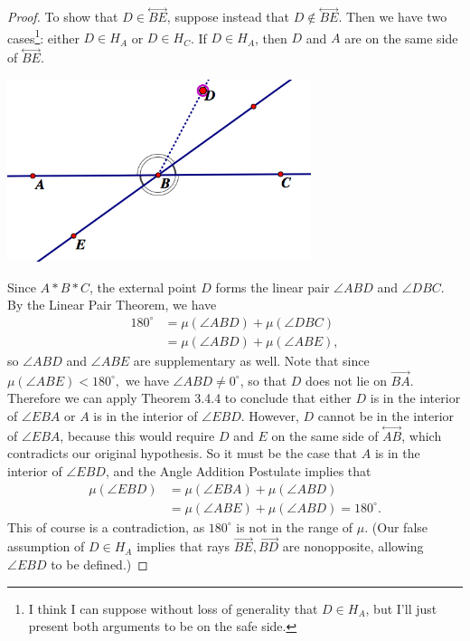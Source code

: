 \documentclass{article}
\newcommand{\ray}[1]{\overrightarrow{#1}}
\renewcommand{\line}[1]{\stackrel{\longleftrightarrow}{#1}}
\renewcommand{\deg}{^{\circ}}
\begin{document}
\begin{proof}
To show that $D\in\line{BE}$, suppose instead that $D\notin\line{BE}$. Then we have two cases\footnote{I think I can suppose without loss of generality that $D\in H_A$, but I'll just present both arguments to be on the safe side.}: either $D\in H_A$ or $D\in H_C$. If $D\in H_A$, then $D$ and $A$ are on the same side of $\line{BE}$. 
\begin{center}
\includegraphics[width=3.5in]{S3_5_6b.png}
\end{center}
Since $A*B*C$, the external point $D$ forms the linear pair $\angle{ABD}$ and $\angle{DBC}$. By the Linear Pair Theorem, we have
\begin{align*}
180\deg&=\mu(\angle{ABD} )+\mu(\angle{DBC})\\
&=\mu(\angle{ABD} )+\mu(\angle{ABE}),
\end{align*} so $\angle{ABD}$ and $\angle{ABE}$ are supplementary as well. Note that since $\mu(\angle{ABE} )<180\deg,$ we have $\angle{ABD}\ne0\deg$, so that $D$ does not lie on $\ray{BA}$. Therefore we can apply Theorem 3.4.4 to conclude that either $D$ is in the interior of $\angle{EBA}$ or $A$ is in the interior of $\angle{EBD}$. However, $D$ cannot be in the interior of $\angle{EBA}$, because this would require $D$ and $E$ on the same side of $\line{AB}$, which contradicts our original hypothesis. So it must be the case that $A$ is in the interior of $\angle{EBD}$, and the Angle Addition Postulate implies that
\begin{align*} \mu(\angle{EBD})&=\mu(\angle{EBA})+\mu(\angle{ABD})\\
&=\mu(\angle{ABE})+\mu(\angle{ABD})=180\deg.
\end{align*} 
This of course is a contradiction, as $180\deg$ is not in the range of $\mu$. (Our false assumption of $D\in H_A$ implies that rays $\ray{BE},\ray{BD}$ are nonopposite, allowing $\angle{EBD}$ to be defined.)


\end{proof}
\end{document}

